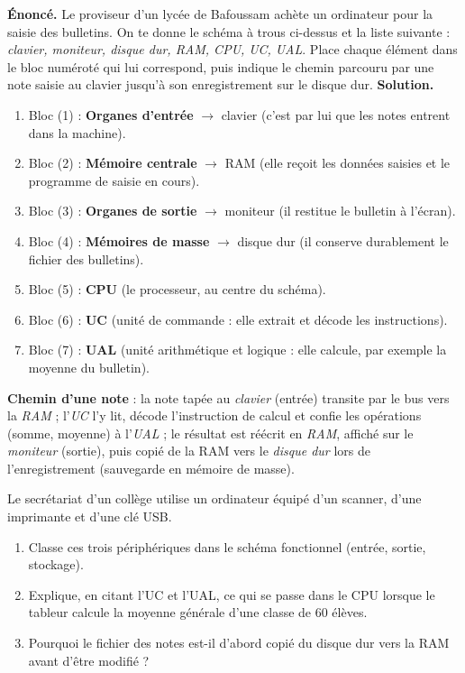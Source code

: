 \documentclass[11pt]{article}
\begin{document}
\begin{exoresolu}
\textbf{Énoncé.} Le proviseur d'un lycée de Bafoussam achète un ordinateur pour la saisie des bulletins. On te donne le schéma à trous ci-dessus et la liste suivante : \emph{clavier, moniteur, disque dur, RAM, CPU, UC, UAL}. Place chaque élément dans le bloc numéroté qui lui correspond, puis indique le chemin parcouru par une note saisie au clavier jusqu'à son enregistrement sur le disque dur.
\tcblower
\textbf{Solution.}
\begin{enumerate}
\item Bloc (1) : \textbf{Organes d'entrée} $\rightarrow$ clavier (c'est par lui que les notes entrent dans la machine).
\item Bloc (2) : \textbf{Mémoire centrale} $\rightarrow$ RAM (elle reçoit les données saisies et le programme de saisie en cours).
\item Bloc (3) : \textbf{Organes de sortie} $\rightarrow$ moniteur (il restitue le bulletin à l'écran).
\item Bloc (4) : \textbf{Mémoires de masse} $\rightarrow$ disque dur (il conserve durablement le fichier des bulletins).
\item Bloc (5) : \textbf{CPU} (le processeur, au centre du schéma).
\item Bloc (6) : \textbf{UC} (unité de commande : elle extrait et décode les instructions).
\item Bloc (7) : \textbf{UAL} (unité arithmétique et logique : elle calcule, par exemple la moyenne du bulletin).
\end{enumerate}
\textbf{Chemin d'une note} : la note tapée au \emph{clavier} (entrée) transite par le bus vers la \emph{RAM} ; l'\emph{UC} l'y lit, décode l'instruction de calcul et confie les opérations (somme, moyenne) à l'\emph{UAL} ; le résultat est réécrit en \emph{RAM}, affiché sur le \emph{moniteur} (sortie), puis copié de la RAM vers le \emph{disque dur} lors de l'enregistrement (sauvegarde en mémoire de masse).
\end{exoresolu}

\begin{exercice}
Le secrétariat d'un collège utilise un ordinateur équipé d'un scanner, d'une imprimante et d'une clé USB.
\begin{enumerate}
\item Classe ces trois périphériques dans le schéma fonctionnel (entrée, sortie, stockage).
\item Explique, en citant l'UC et l'UAL, ce qui se passe dans le CPU lorsque le tableur calcule la moyenne générale d'une classe de 60 élèves.
\item Pourquoi le fichier des notes est-il d'abord copié du disque dur vers la RAM avant d'être modifié ?
\end{enumerate}
\end{exercice}
\end{document}
